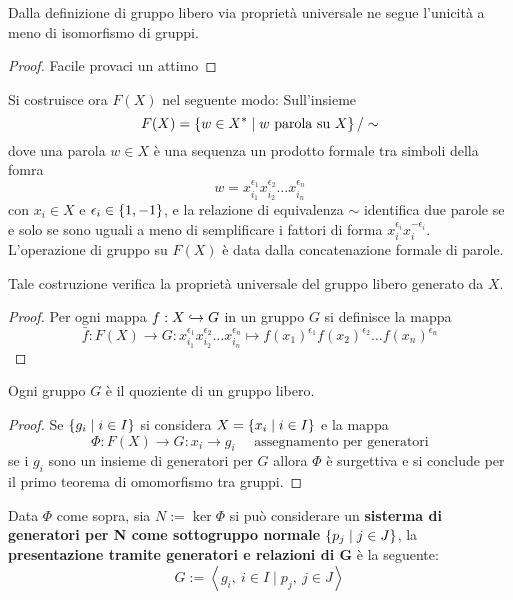 \documentclass[]{article}
\begin{document}
\begin{proposition}  \nl
    Dalla definizione di gruppo libero via propriet\`a universale ne segue l'unicit\`a a meno di isomorfismo di gruppi.
\end{proposition}

\begin{proof}
    Facile provaci un attimo
\end{proof}

\begin{proposition}  \nl
    Si costruisce ora $F(X)$ nel seguente modo: \nl
    Sull'insieme
    \[
        F(X) = \left\{ w \in X^* \mid w \text{ parola su } X \right\} / \sim
    \]
    dove una parola $w \in X$ \`e una sequenza un prodotto formale tra simboli della fomra
    \[
        w = x_{i_1}^{\epsilon_1} x_{i_2}^{\epsilon_2} \ldots x_{i_n}^{\epsilon_n}
    \]
    con $x_i \in X$ e $\epsilon_i \in \left\{ 1, -1 \right\}$, e la relazione di equivalenza $\sim$ identifica due parole
    se e solo se sono uguali a meno di semplificare i fattori di forma $x_i^{\epsilon_i} x_i^{-\epsilon_i}$. \nl
    L'operazione di gruppo su $F(X)$ \`e data dalla concatenazione formale di parole. \nl

    Tale costruzione verifica la propriet\`a universale del gruppo libero generato da $X$.
\end{proposition}

\begin{proof} \nl
    Per ogni mappa $f: X \hookrightarrow G$ in un gruppo $G$ si definisce la mappa
    \[
        \bar{f}: F(X) \to G: x_{i_1}^{\epsilon_1} x_{i_2}^{\epsilon_2} \ldots x_{i_n}^{\epsilon_n} \mapsto f(x_1)^{\epsilon_1} f(x_2)^{\epsilon_2} \ldots f(x_n)^{\epsilon_n}
    \]
\end{proof}

\begin{lemma} \nl
    Ogni gruppo $G$ \`e il quoziente di un gruppo libero.
\end{lemma}

\begin{proof} \nl
    Se $\left\{ g_i \mid i \in I \right\}$ si considera $X = \left\{ x_i \mid i \in I \right\}$ e la mappa
    \[
        \Phi: F(X) \to G: x_i \to g_i \quad \text{ assegnamento per generatori}
    \]
    se i $g_i$ sono un insieme di generatori per $G$ allora $\Phi$ \`e surgettiva e si conclude
    per il primo teorema di omomorfismo tra gruppi.
\end{proof}

\begin{definition}  \nl
    Data $\Phi$ come sopra, sia $N := \ker{\Phi}$ si pu\`o considerare un \textbf{sisterma di generatori per N come sottogruppo normale}
    $\left\{ p_j \mid j \in J \right\}$, la \textbf{presentazione tramite generatori e relazioni di G} \`e la seguente:
    \[
        G := \left< g_i, \ i \in I \mid p_j, \ j \in J \right>
    \]
\end{definition}
\end{document}
